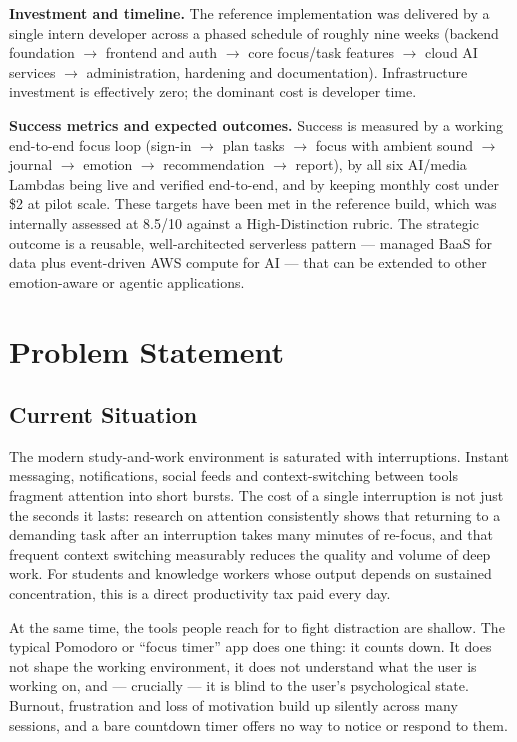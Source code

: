 \documentclass[a4paper,11pt]{article}
\begin{document}
	\medskip
	\noindent\textbf{Investment and timeline.} The reference implementation was delivered by a
	single intern developer across a phased schedule of roughly nine weeks (backend
	foundation \(\rightarrow\) frontend and auth \(\rightarrow\) core focus/task features
	\(\rightarrow\) cloud AI services \(\rightarrow\) administration, hardening and
	documentation). Infrastructure investment is effectively zero; the dominant cost is
	developer time.

	\medskip
	\noindent\textbf{Success metrics and expected outcomes.} Success is measured by a working
	end-to-end focus loop (sign-in \(\rightarrow\) plan tasks \(\rightarrow\) focus with
	ambient sound \(\rightarrow\) journal \(\rightarrow\) emotion \(\rightarrow\)
	recommendation \(\rightarrow\) report), by all six AI/media Lambdas being live and
	verified end-to-end, and by keeping monthly cost under \$2 at pilot scale. These targets
	have been met in the reference build, which was internally assessed at 8.5/10 against a
	High-Distinction rubric. The strategic outcome is a reusable, well-architected serverless
	pattern --- managed BaaS for data plus event-driven AWS compute for AI --- that can be
	extended to other emotion-aware or agentic applications.

	\clearpage

	\section{Problem Statement}

	\subsection{Current Situation}
	The modern study-and-work environment is saturated with interruptions. Instant messaging,
	notifications, social feeds and context-switching between tools fragment attention into
	short bursts. The cost of a single interruption is not just the seconds it lasts: research
	on attention consistently shows that returning to a demanding task after an interruption
	takes many minutes of re-focus, and that frequent context switching measurably reduces the
	quality and volume of deep work. For students and knowledge workers whose output depends on
	sustained concentration, this is a direct productivity tax paid every day.

	At the same time, the tools people reach for to fight distraction are shallow. The typical
	Pomodoro or ``focus timer'' app does one thing: it counts down. It does not shape the
	working environment, it does not understand what the user is working on, and --- crucially
	--- it is blind to the user's psychological state. Burnout, frustration and loss of
	motivation build up silently across many sessions, and a bare countdown timer offers no
	way to notice or respond to them.
\end{document}
